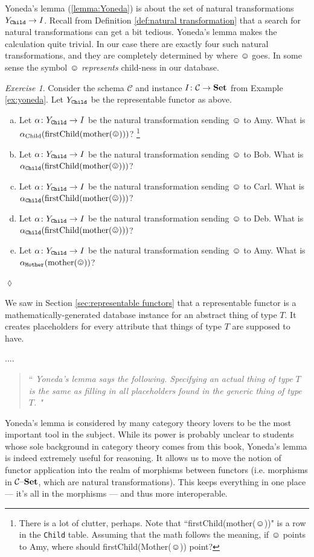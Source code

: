 \documentclass{book}
\def\tn{\textnormal}
\def\mc{\mathcal}
\def\to{\rightarrow}
\def\taking{\colon}
\def\Set{{\bf Set}}
\def\set{{\text \textendash}{\bf Set}}
\def\mcC{\mc{C}}
\theoremstyle{remark}
\newtheorem{exc}[subsubsection]{Exercise}
\newenvironment{exercise}{\begin{exc}}{\hspace*{\fill}$\lozenge$\end{exc}}
\newenvironment{slogan}{\addtocounter{subsubsection}{1}\vspace{.1in}\begin{sloppypar}\noindent{\em Slogan}\;\arabic{chapter}.\arabic{section}.\arabic{subsection}.\arabic{subsubsection}. \begin{quote}``\slshape}{"\end{quote}\end{sloppypar}\vspace{.1in}}
\theoremstyle{definition}
\def\sexc{\begin{enumerate}[a.)]\setlength{\itemsep}{.1cm}\setlength{\parskip}{.1cm}\item}
\def\next{\item}
\def\endsexc{\end{enumerate}}
\begin{document}
Yoneda's lemma (\ref{lemma:Yoneda}) is about the set of natural transformations $Y_{\tt Child}\to I$. Recall from Definition \ref{def:natural transformation} that a search for natural transformations can get a bit tedious. Yoneda's lemma makes the calculation quite trivial. In our case there are exactly four such natural transformations, and they are completely determined by where $\smiley$ goes. In some sense the symbol $\smiley$ {\em represents} child-ness in our database. 

\begin{exercise}
Consider the schema $\mcC$ and instance $I\taking\mcC\to\Set$ from Example \ref{ex:yoneda}. Let $Y_{\tt Child}$ be the representable functor as above. 
\sexc Let $\alpha\taking Y_{\tt Child}\to I$ be the natural transformation sending $\smiley$ to Amy. What is $\alpha_{\tn{Child}}(\tn{firstChild(mother}(\smiley)))$?
\footnote{There is a lot of clutter, perhaps. Note that ``firstChild(mother($\smiley$))" is a row in the {\tt Child} table. Assuming that the math follows the meaning, if $\smiley$ points to Amy, where should firstChild(Mother($\smiley$)) point?}
\next Let $\alpha\taking Y_{\tt Child}\to I$ be the natural transformation sending $\smiley$ to Bob. What is $\alpha_{\tt Child}(\tn{firstChild(mother}(\smiley)))$?
\next Let $\alpha\taking Y_{\tt Child}\to I$ be the natural transformation sending $\smiley$ to Carl. What is $\alpha_{\tt Child}(\tn{firstChild(mother}(\smiley)))$?
\next Let $\alpha\taking Y_{\tt Child}\to I$ be the natural transformation sending $\smiley$ to Deb. What is $\alpha_{\tt Child}(\tn{firstChild(mother}(\smiley)))$?
\next Let $\alpha\taking Y_{\tt Child}\to I$ be the natural transformation sending $\smiley$ to Amy. What is $\alpha_{\tt Mother}(\tn{mother}(\smiley))$?
\endsexc
\end{exercise}

We saw in Section \ref{sec:representable functors} that a representable functor is a mathematically-generated database instance for an abstract thing of type $T$. It creates placeholders for every attribute that things of type $T$ are supposed to have.

\begin{slogan}
Yoneda's lemma says the following. Specifying an actual thing of type $T$ is the same as filling in all placeholders found in the generic thing of type $T$.
\end{slogan}

Yoneda's lemma is considered by many category theory lovers to be the most important tool in the subject. While its power is probably unclear to students whose sole background in category theory comes from this book, Yoneda's lemma is indeed extremely useful for reasoning. It allows us to move the notion of functor application into the realm of morphisms between functors (i.e. morphisms in $\mcC\set$, which are natural transformations). This keeps everything in one place --- it's all in the morphisms --- and thus more interoperable.
\end{document}
